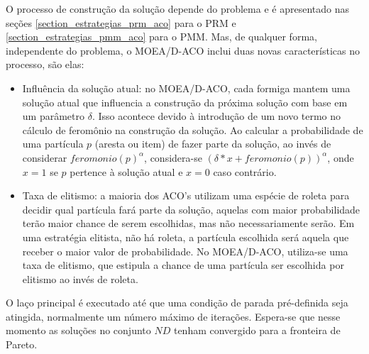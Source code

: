 O processo de construção da solução depende do problema e é apresentado nas seções \ref{section_estrategias_prm_aco} para o PRM e  \ref{section_estrategias_pmm_aco} para o PMM. Mas, de qualquer forma, independente do problema, o MOEA/D-ACO inclui duas novas características no processo, são elas:

\begin{itemize}
	\item Influência da solução atual: no MOEA/D-ACO, cada formiga mantem uma solução atual que influencia a construção da próxima solução com base em um parâmetro $\delta$. Isso acontece devido à introdução de um novo termo no cálculo de feromônio na construção da solução. Ao calcular a probabilidade de uma partícula $p$ (aresta ou item) de fazer parte da solução, ao invés de considerar $feromonio(p)^\alpha$, considera-se $(\delta * x + feromonio(p))^\alpha$, onde $x = 1$ se $p$ pertence à solução atual e $x = 0$ caso contrário.
	\item Taxa de elitismo: a maioria dos ACO's utilizam uma espécie de roleta para decidir qual partícula fará parte da solução, aquelas com maior probabilidade terão maior chance de serem escolhidas, mas não necessariamente serão. Em uma estratégia elitista, não há roleta, a partícula escolhida será aquela que receber o maior valor de probabilidade. No MOEA/D-ACO, utiliza-se uma taxa de elitismo, que estipula a chance de uma partícula ser escolhida por elitismo ao invés de roleta.
\end{itemize}

O laço principal é executado até que uma condição de parada pré-definida seja atingida, normalmente um número máximo de iterações. Espera-se que nesse momento as soluções no conjunto $ND$ tenham convergido para a fronteira de Pareto.

